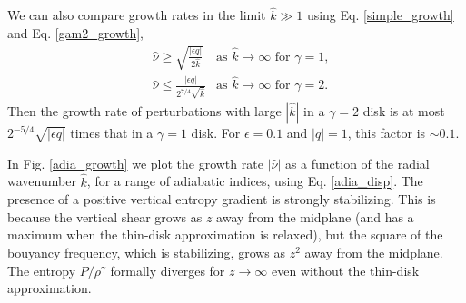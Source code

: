 We can also compare growth rates in the limit $\hat{k}\gg1$ using
Eq. \ref{simple_growth} and Eq. \ref{gam2_growth},
\begin{align}
  &\hat{\nu} \geq \sqrt{\frac{|\epsilon q|}{2\hat{k}}}
  &  \text{as }  \hat{k}\to\infty  \text{ for }  \gamma=1, \\
  &\hat{\nu} \leq \frac{|\epsilon q|}{2^{7/4}\sqrt{\hat{k}}}
  &\text{as }  \hat{k}\to\infty  \text{ for }  \gamma=2.
\end{align}
Then the growth rate of perturbations with large $|\hat{k}|$ in a
$\gamma=2$ disk is at most $2^{-5/4}\sqrt{|\epsilon q|}$ times that in a
$\gamma=1$ disk. For $\epsilon = 0.1$ and $|q|=1$, this factor is
$\sim 0.1$.  

In Fig. \ref{adia_growth} we plot the growth rate $|\hat{\nu}|$ as a
function of the radial wavenumber $\hat{k}$, for a range of adiabatic
indices, using Eq. \ref{adia_disp}. The presence of a positive
vertical entropy gradient is strongly stabilizing. This is because the
vertical shear grows as $z$ away from the midplane (and has a maximum
when the thin-disk approximation is relaxed), but the
square of the bouyancy frequency, which is stabilizing, grows as $z^2$
away from the midplane. The entropy $P/\rho^\gamma$ formally diverges
for $z\to\infty$ even without the thin-disk approximation.        

